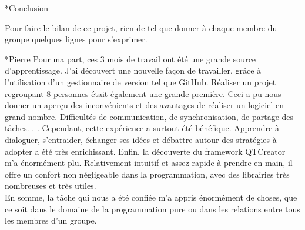 \documentclass[a4paper, 12pt]{report}
\begin{document}
	\begin{chapter}*{Conclusion}
		Pour faire le bilan de ce projet, rien de tel que donner à chaque membre du groupe quelques lignes pour s'exprimer.

		\begin{section}*{Pierre}
Pour ma part, ces 3 mois de travail ont été une grande source d'apprentissage. J'ai découvert une nouvelle façon de travailler,
		grâce à l'utilisation d'un gestionnaire de version tel que GitHub. Réaliser un projet regroupant 8 personnes était également une grande première.
		Ceci a pu nous donner un aperçu des inconvénients et des avantages de réaliser un logiciel en grand nombre. Difficultés de communication,
		de synchronisation, de partage des tâches. . . Cependant, cette expérience a surtout été bénéfique. Apprendre à dialoguer, s'entraider, échanger ses
		idées et débattre autour des stratégies à adopter a été très enrichissant. Enfin, la découverte du framework QTCreator m'a énormément plu.
		Relativement intuitif et assez rapide à prendre en main, il offre un confort non négligeable dans la programmation,
	    avec des librairies très nombreuses et très utiles.\\
	    En somme, la tâche qui nous a été confiée m'a appris énormément de choses, que ce soit dans le domaine de la programmation pure ou dans les 
	    relations entre tous les membres d'un groupe.
		\end{section}


\end{chapter}
\end{document}
